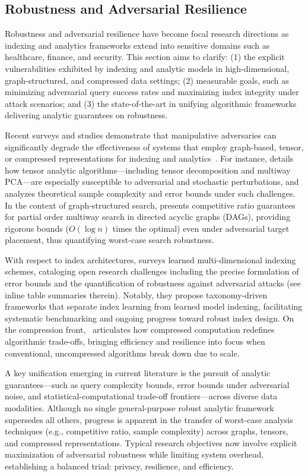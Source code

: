 \documentclass[sigconf]{acmart}
\begin{document}
\subsection{Robustness and Adversarial Resilience}

Robustness and adversarial resilience have become focal research directions as indexing and analytics frameworks extend into sensitive domains such as healthcare, finance, and security. This section aims to clarify: (1) the explicit vulnerabilities exhibited by indexing and analytic models in high-dimensional, graph-structured, and compressed data settings; (2) measurable goals, such as minimizing adversarial query success rates and maximizing index integrity under attack scenarios; and (3) the state-of-the-art in unifying algorithmic frameworks delivering analytic guarantees on robustness.

Recent surveys and studies demonstrate that manipulative adversaries can significantly degrade the effectiveness of systems that employ graph-based, tensor, or compressed representations for indexing and analytics~\cite{ref104,ref107,ref110,ref118}. For instance, \cite{ref104} details how tensor analytic algorithms---including tensor decomposition and multiway PCA---are especially susceptible to adversarial and stochastic perturbations, and analyzes theoretical sample complexity and error bounds under such challenges. In the context of graph-structured search, \cite{ref107} presents competitive ratio guarantees for partial order multiway search in directed acyclic graphs (DAGs), providing rigorous bounds ($O(\log n)$ times the optimal) even under adversarial target placement, thus quantifying worst-case search robustness.

With respect to index architectures, \cite{ref110} surveys learned multi-dimensional indexing schemes, cataloging open research challenges including the precise formulation of error bounds and the quantification of robustness against adversarial attacks (see inline table summaries therein). Notably, they propose taxonomy-driven frameworks that separate index learning from learned model indexing, facilitating systematic benchmarking and ongoing progress toward robust index design. On the compression front,~\cite{ref118} articulates how compressed computation redefines algorithmic trade-offs, bringing efficiency and resilience into focus when conventional, uncompressed algorithms break down due to scale.

A key unification emerging in current literature is the pursuit of analytic guarantees---such as query complexity bounds, error bounds under adversarial noise, and statistical-computational trade-off frontiers---across diverse data modalities. Although no single general-purpose robust analytic framework supersedes all others, progress is apparent in the transfer of worst-case analysis techniques (e.g., competitive ratio, sample complexity) across graphs, tensors, and compressed representations. Typical research objectives now involve explicit maximization of adversarial robustness while limiting system overhead, establishing a balanced triad: privacy, resilience, and efficiency.
\end{document}
